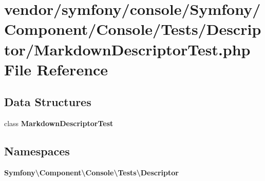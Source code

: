 \section{vendor/symfony/console/\+Symfony/\+Component/\+Console/\+Tests/\+Descriptor/\+Markdown\+Descriptor\+Test.php File Reference}
\label{_markdown_descriptor_test_8php}
\subsection*{Data Structures}
\begin{DoxyCompactItemize}
\item 
class {\bf Markdown\+Descriptor\+Test}
\end{DoxyCompactItemize}
\subsection*{Namespaces}
\begin{DoxyCompactItemize}
\item 
 {\bf Symfony\textbackslash{}\+Component\textbackslash{}\+Console\textbackslash{}\+Tests\textbackslash{}\+Descriptor}
\end{DoxyCompactItemize}
